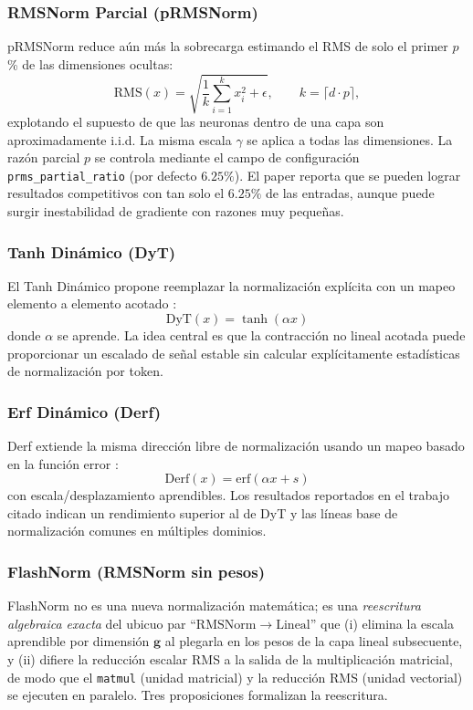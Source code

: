 \subsubsection{RMSNorm Parcial (pRMSNorm)}
pRMSNorm \citep{zhang_root_2019} reduce aún más la sobrecarga estimando el RMS de solo el primer $p$\% de las dimensiones ocultas:
\[
\mathrm{RMS}(x)=\sqrt{\frac{1}{k}\sum_{i=1}^{k}x_i^2+\epsilon},\qquad k=\lceil d\cdot p\rceil,
\]
explotando el supuesto de que las neuronas dentro de una capa son aproximadamente i.i.d. La misma escala $\gamma$ se aplica a todas las dimensiones. La razón parcial $p$ se controla mediante el campo de configuración \texttt{prms\_partial\_ratio} (por defecto $6.25\%$). El paper reporta que se pueden lograr resultados competitivos con tan solo el $6.25\%$ de las entradas, aunque puede surgir inestabilidad de gradiente con razones muy pequeñas.

\subsubsection{Tanh Dinámico (DyT)}
El Tanh Dinámico propone reemplazar la normalización explícita con un mapeo elemento a elemento acotado \citep{zhu_transformers_2025}:
\[
\mathrm{DyT}(x)=\tanh(\alpha x)
\]
donde $\alpha$ se aprende. La idea central es que la contracción no lineal acotada puede proporcionar un escalado de señal estable sin calcular explícitamente estadísticas de normalización por token.

\subsubsection{Erf Dinámico (Derf)}
Derf extiende la misma dirección libre de normalización usando un mapeo basado en la función error \citep{chen_stronger_2025}:
\[
\mathrm{Derf}(x)=\mathrm{erf}(\alpha x+s)
\]
con escala/desplazamiento aprendibles. Los resultados reportados en el trabajo citado indican un rendimiento superior al de DyT y las líneas base de normalización comunes en múltiples dominios.

\subsubsection{FlashNorm (RMSNorm sin pesos)}
FlashNorm \citep{graef2026flashnorm} no es una nueva normalización matemática; es una \emph{reescritura algebraica exacta} del ubicuo par ``$\mathrm{RMSNorm} \to \mathrm{Lineal}$'' que (i) elimina la escala aprendible por dimensión $\mathbf{g}$ al plegarla en los pesos de la capa lineal subsecuente, y (ii) difiere la reducción escalar RMS a la salida de la multiplicación matricial, de modo que el \texttt{matmul} (unidad matricial) y la reducción RMS (unidad vectorial) se ejecuten en paralelo. Tres proposiciones formalizan la reescritura.

